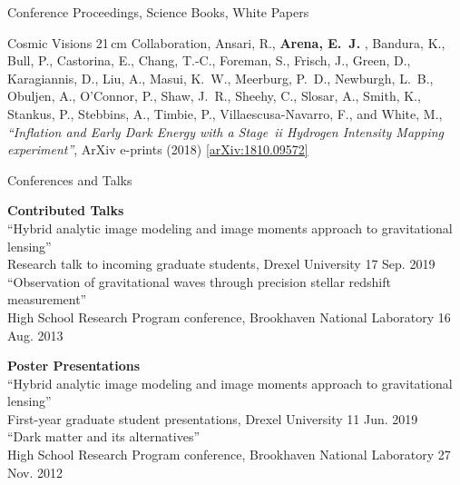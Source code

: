 \documentclass{resume} %
\newcommand{\forceindent}{\leavevmode{\parindent=1em\indent}}
\begin{document}
\begin{rSection}{Conference Proceedings, Science Books, White Papers}
\begin{etaremune}
\item {Cosmic Visions 21$\,$cm Collaboration}, {Ansari}, R., \textbf{{Arena}, E.~J.} , 
	{Bandura}, K., {Bull}, P., {Castorina}, E., {Chang}, T.-C., 
	{Foreman}, S., {Frisch}, J., {Green}, D., {Karagiannis}, D., 
	{Liu}, A., {Masui}, K.~W., {Meerburg}, P.~D., {Newburgh}, L.~B., 
	{Obuljen}, A., {O'Connor}, P., {Shaw}, J.~R., {Sheehy}, C., 
	{Slosar}, A., {Smith}, K., {Stankus}, P., {Stebbins}, A., 
	{Timbie}, P., {Villaescusa-Navarro}, F., and {White}, M., 
\textit{``Inflation and Early Dark Energy with a {Stage~{\sc ii}} Hydrogen Intensity Mapping experiment''}, ArXiv e-prints (2018) \href{https://arxiv.org/abs/1810.09572}{[arXiv:1810.09572]}

\end{etaremune}

\end{rSection}


\begin{rSection}{Conferences and Talks}

\textbf{Contributed Talks}\\
``Hybrid analytic image modeling and image moments approach to gravitational lensing''\\
\forceindent Research talk to incoming graduate students, Drexel University \hfill 17 Sep. 2019\\
``Observation of gravitational waves through precision stellar redshift measurement''\\
\forceindent High School Research Program conference, Brookhaven National Laboratory \hfill 16 Aug. 2013

\textbf{Poster Presentations}\\
``Hybrid analytic image modeling and image moments approach to gravitational lensing''\\
\forceindent First-year graduate student presentations, Drexel University \hfill 11 Jun. 2019\\
``Dark matter and its alternatives''\\
\forceindent High School Research Program conference, Brookhaven National Laboratory \hfill 27 Nov. 2012

\end{rSection}

\end{document}
